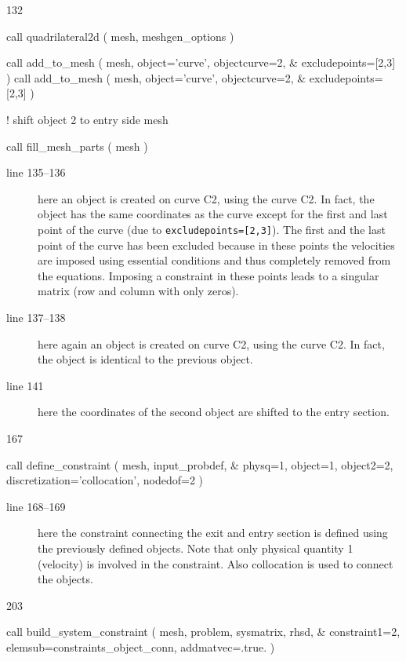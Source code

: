 \begin{listing}{132}
                                                                                
   call quadrilateral2d ( mesh, meshgen_options )

   call add_to_mesh ( mesh, object='curve', objectcurve=2, &
     excludepoints=[2,3] )
   call add_to_mesh ( mesh, object='curve', objectcurve=2, &
     excludepoints=[2,3] )

 ! shift object 2 to entry side
   mesh%

   call fill_mesh_parts ( mesh )

\end{listing}
\begin{description}
   \item[line 135--136] here an object is created on curve C2, using the curve
C2. In fact, the object has the same coordinates as the curve except for the
first and last point of the curve (due to \texttt{excludepoints=[2,3]}).
The first and the last point of the curve has been excluded
     because in these points the velocities are imposed
     using essential conditions and thus completely removed from the equations.
     Imposing a constraint in these points leads to a singular matrix (row and
     column with only zeros).
   \item[line 137--138] here again an object is created on curve C2,
using the curve C2. In fact, the object is identical to the previous object.
   \item[line 141] here the coordinates of the second object are shifted
to the entry section.
\end{description}
\begin{listing}{167}

   call define_constraint ( mesh, input_probdef, &
     physq=1, object=1, object2=2, discretization='collocation', nodedof=2 )

\end{listing}
\begin{description}
   \item[line 168--169] here the constraint connecting the exit and entry
section is defined using the previously defined objects.
     Note that only physical quantity 1 (velocity) is involved
     in the constraint. Also collocation is used to connect the objects.
\end{description}
\begin{listing}{203}
                                                                                
   call build_system_constraint ( mesh, problem, sysmatrix, rhsd, &
     constraint1=2, elemsub=constraints_object_conn, addmatvec=.true. )

\end{listing}
